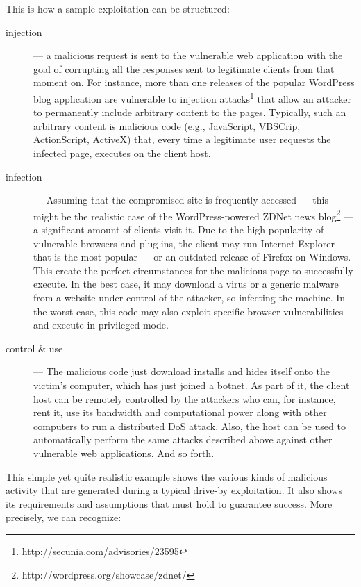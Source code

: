 \begin{example}
  This is how a sample exploitation can be structured:
  \begin{description}
  \item [injection] --- a malicious request is sent to the vulnerable
  web application with the goal of corrupting all the responses sent
  to legitimate clients from that moment on. For instance, more than
  one releases of the popular \textsf{WordPress} blog application are
  vulnerable to injection
  attacks\footnote{http://secunia.com/advisories/23595} that allow an
  attacker to permanently include arbitrary content to the
  pages. Typically, such an arbitrary content is malicious code (e.g.,
  JavaScript, VBSCrip, ActionScript, ActiveX) that, every time a
  legitimate user requests the infected page, executes on the client
  host.
  \item [infection] --- Assuming that the compromised site is
  frequently accessed --- this might be the realistic case of the
  \textsf{WordPress}\hyp{}powered \textsf{ZDNet} news
  blog\footnote{http://wordpress.org/showcase/zdnet/} --- a
  significant amount of clients visit it. Due to the high popularity
  of vulnerable browsers and plug-ins, the client may run
  \textsf{Internet Explorer} --- that is the most popular --- or an
  outdated release of \textsf{Firefox} on \textsf{Windows}. This
  create the perfect circumstances for the malicious page to
  successfully execute. In the best case, it may download a virus or a
  generic malware from a website under control of the attacker, so
  infecting the machine. In the worst case, this code may also exploit
  specific browser vulnerabilities and execute in privileged mode.
  \item [control \& use] --- The malicious code just download installs
  and hides itself onto the victim's computer, which has just joined a
  botnet. As part of it, the client host can be remotely controlled by
  the attackers who can, for instance, rent it, use its bandwidth and
  computational power along with other computers to run a distributed
  \ac{DoS} attack. Also, the host can be used to automatically perform
  the same attacks described above against other vulnerable web
  applications. And so forth.
  \end{description}
\end{example}

This simple yet quite realistic example shows the various kinds of
malicious activity that are generated during a typical drive-by
exploitation. It also shows its requirements and assumptions that must
hold to guarantee success. More precisely, we can recognize:

